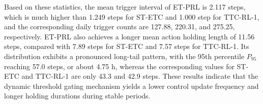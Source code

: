 \documentclass[preprint,12pt,number]{elsarticle}
\begin{document}
\begin{table}[htbp]
\centering
\caption{Temporal sparsity and action holding statistics of different control strategies}\label{tab:temporal-sparsity}
\small
\setlength{\tabcolsep}{8pt}
\renewcommand{\arraystretch}{1.15}
\end{table}

Based on these statistics, the mean trigger interval of ET-PRL is 2.117 steps, which is much higher than 1.249 steps for ST-ETC and 1.000 step for TTC-RL-1, and the corresponding daily trigger counts are 127.88, 220.31, and 275.25, respectively. ET-PRL also achieves a longer mean action holding length of 11.56 steps, compared with 7.89 steps for ST-ETC and 7.57 steps for TTC-RL-1. Its distribution exhibits a pronounced long-tail pattern, with the 95th percentile \(P_{95}\) reaching 57.0 steps, or about 4.75 h, whereas the corresponding values for ST-ETC and TTC-RL-1 are only 43.3 and 42.9 steps. These results indicate that the dynamic threshold gating mechanism yields a lower control update frequency and longer holding durations during stable periods.
\end{document}
